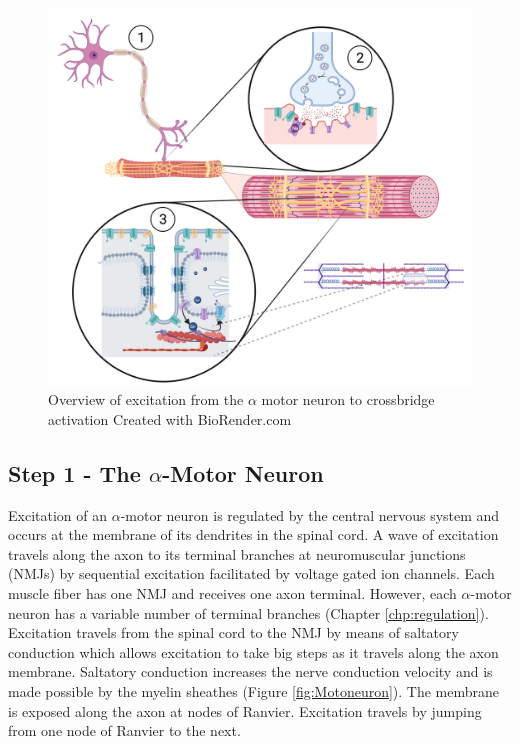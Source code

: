 \begin{figure}[!ht]
    \centering
    \includegraphics[width=1\linewidth]{./figure/excitation_overview.png}
    \caption{Overview of excitation from the $\alpha$ motor neuron to crossbridge activation \footnotesize{Created with BioRender.com}}
    \label{fig:excitation_overview}
\end{figure}

\subsection{Step 1 - The $\alpha$-Motor Neuron}
Excitation of an $\alpha$-motor neuron is regulated by the central nervous system and occurs at the membrane of its dendrites in the spinal cord. A wave of excitation travels along the axon to its terminal branches at neuromuscular junctions (NMJs) by sequential excitation facilitated by voltage gated ion channels. Each muscle fiber has one NMJ and receives one axon terminal. However, each $\alpha$-motor neuron has a variable number of terminal branches (Chapter \ref{chp:regulation}).  Excitation travels from the spinal cord to the NMJ by means of saltatory conduction which allows excitation to take big steps as it travels along the axon membrane. Saltatory conduction increases the nerve conduction velocity and is made possible by the myelin sheathes (Figure \ref{fig:Motoneuron}). The membrane is exposed along the axon at nodes of Ranvier. Excitation travels by jumping from one node of Ranvier to the next.\footnotemark{} 

